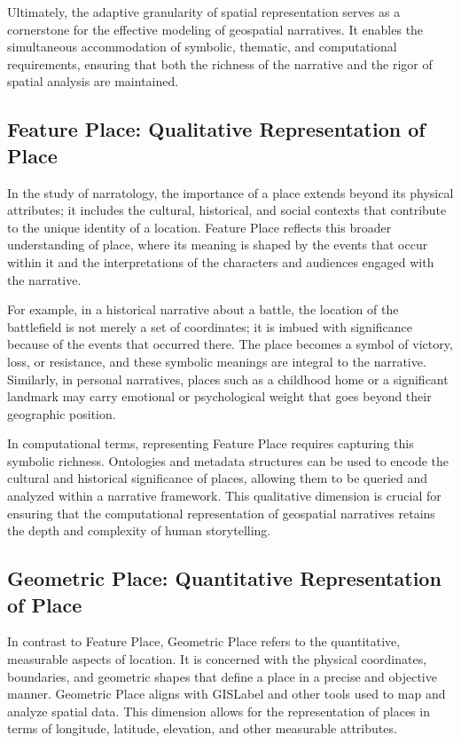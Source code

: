 Ultimately, the adaptive granularity of spatial representation serves as a cornerstone for the effective modeling of geospatial narratives. It enables the simultaneous accommodation of symbolic, thematic, and computational requirements, ensuring that both the richness of the narrative and the rigor of spatial analysis are maintained.

\subsection{Feature Place: Qualitative Representation of Place}\label{V-subsec:featurePlace}

In the study of narratology, the importance of a place extends beyond its physical attributes; it includes the cultural, historical, and social contexts that contribute to the unique identity of a location. Feature Place reflects this broader understanding of place, where its meaning is shaped by the events that occur within it and the interpretations of the characters and audiences engaged with the narrative.

For example, in a historical narrative about a battle, the location of the battlefield is not merely a set of coordinates; it is imbued with significance because of the events that occurred there. The place becomes a symbol of victory, loss, or resistance, and these symbolic meanings are integral to the narrative. Similarly, in personal narratives, places such as a childhood home or a significant landmark may carry emotional or psychological weight that goes beyond their geographic position.

In computational terms, representing Feature Place requires capturing this symbolic richness. Ontologies and metadata structures can be used to encode the cultural and historical significance of places, allowing them to be queried and analyzed within a narrative framework. This qualitative dimension is crucial for ensuring that the computational representation of geospatial narratives retains the depth and complexity of human storytelling.

\subsection{Geometric Place: Quantitative Representation of Place}\label{V-subsec:geometricPlace}

In contrast to Feature Place, Geometric Place refers to the quantitative, measurable aspects of location. It is concerned with the physical coordinates, boundaries, and geometric shapes that define a place in a precise and objective manner. Geometric Place aligns with \acrshort{GISLabel} and other tools used to map and analyze spatial data. This dimension allows for the representation of places in terms of longitude, latitude, elevation, and other measurable attributes.

